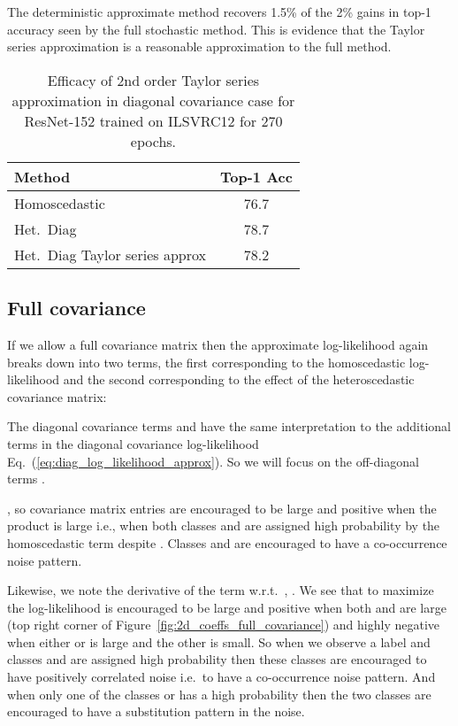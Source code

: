 \documentclass[final]{cvpr}
\begin{document}
The deterministic approximate method recovers 1.5\% of the 2\% gains in top-1 accuracy seen by the full stochastic method. This is evidence that the Taylor series approximation is a reasonable approximation to the full method.

\begin{table}[tbh]
\centering
\begin{tabular}{lc}
\toprule
Method & Top-1 Acc \\
\midrule
Homoscedastic & 76.7 \\
Het.\ Diag & 78.7 \\ 
Het.\ Diag Taylor series approx & 78.2 \\ 
\bottomrule
\end{tabular}
\caption{Efficacy of 2nd order Taylor series approximation in diagonal covariance case for ResNet-152 trained on ILSVRC12 for 270 epochs.} 
\label{table:taylor_series_ilsvrc12}
\end{table}

\subsection{Full covariance}

If we allow a full covariance matrix  then the approximate log-likelihood again breaks down into two terms, the first corresponding to the homoscedastic log-likelihood and the second corresponding to the effect of the heteroscedastic covariance matrix:



The diagonal covariance terms  and  have the same interpretation to the additional terms in the diagonal covariance log-likelihood Eq.~(\ref{eq:diag_log_likelihood_approx}). So we will focus on the off-diagonal terms .

, so covariance matrix entries are encouraged to be large and positive when the product  is large i.e., when both classes  and  are assigned high probability by the homoscedastic term despite . Classes  and  are encouraged to have a co-occurrence noise pattern.

Likewise, we note the derivative of the  term w.r.t.\ , . We see that to maximize the log-likelihood  is encouraged to be large and positive when both  and  are large (top right corner of Figure~\ref{fig:2d_coeffs_full_covariance}) and highly negative when either  or  is large and the other is small. So when we observe a label  and classes  and  are assigned high probability then these classes are encouraged to have positively correlated noise i.e.\ to have a co-occurrence noise pattern. And when only one of the classes  or  has a high probability then the two classes are encouraged to have a substitution pattern in the noise. 
\end{document}
